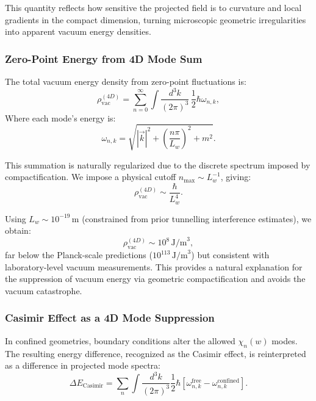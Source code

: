 \documentclass[12pt]{article}
\begin{document}
This quantity reflects how sensitive the projected field is to curvature and local gradients in the compact dimension, turning microscopic geometric irregularities into apparent vacuum energy densities.

\subsubsection*{Zero-Point Energy from 4D Mode Sum}

The total vacuum energy density from zero-point fluctuations is:
\begin{equation}
\rho_{\text{vac}}^{(4D)} = \sum_{n=0}^\infty \int \frac{d^3k}{(2\pi)^3} \, \frac{1}{2} \hbar \omega_{n,k},
\label{eq:zeropoint_density}
\end{equation}
Where each mode’s energy is:
\begin{equation}
\omega_{n,k} = \sqrt{|\vec{k}|^2 + \left( \frac{n \pi}{L_w} \right)^2 + m^2}.
\end{equation}

This summation is naturally regularized due to the discrete spectrum imposed by compactification. We impose a physical cutoff \(n_{\text{max}} \sim L_w^{-1}\), giving:
\begin{equation}
\rho_{\text{vac}}^{(4D)} \sim \frac{\hbar}{L_w^4}.
\label{eq:vac_cutoff_estimate}
\end{equation}

Using \(L_w \sim 10^{-19}\,\text{m}\) (constrained from prior tunnelling interference estimates), we obtain:
\begin{equation}
\rho_{\text{vac}}^{(4D)} \sim 10^8 \,\text{J/m}^3,
\end{equation}
far below the Planck-scale predictions (\(10^{113}\,\text{J/m}^3\)) but consistent with laboratory-level vacuum measurements. This provides a natural explanation for the suppression of vacuum energy via geometric compactification and avoids the vacuum catastrophe.

\subsubsection*{Casimir Effect as a 4D Mode Suppression}

In confined geometries, boundary conditions alter the allowed \(\chi_n(w)\) modes. The resulting energy difference, recognized as the Casimir effect, is reinterpreted as a difference in projected mode spectra:
\begin{equation}
\Delta E_{\text{Casimir}} = \sum_{n} \int \frac{d^3k}{(2\pi)^3} \frac{1}{2} \hbar \left[ \omega_{n,k}^{\text{free}} - \omega_{n,k}^{\text{confined}} \right].
\label{eq:casimir_difference}
\end{equation}
\end{document}
